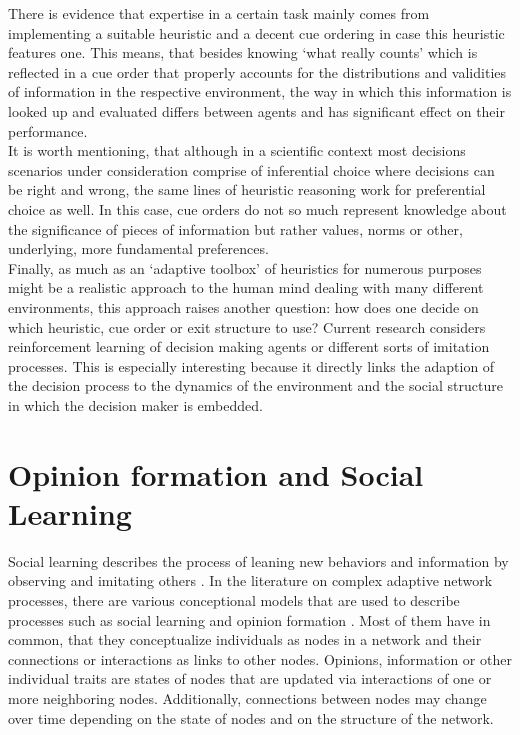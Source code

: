 There is evidence \citep{Garcia-Retamero2009,Pachur2013} that expertise in a certain task mainly comes from implementing a suitable heuristic and a decent cue ordering in case this heuristic features one. This means, that besides knowing `what really counts' which is reflected in a cue order that properly accounts for the distributions and validities of information in the respective environment, the way in which this information is looked up and evaluated differs between agents and has significant effect on their performance.\\
It is worth mentioning, that although in a scientific context most decisions scenarios under consideration comprise of inferential choice where decisions can be right and wrong, the same lines of heuristic reasoning work for preferential choice as well. In this case, cue orders do not so much represent knowledge about the significance of pieces of information but rather values, norms or other, underlying, more fundamental preferences.\\
Finally, as much as an `adaptive toolbox' of heuristics for numerous purposes might be a realistic approach to the human mind dealing with many different environments, this approach raises another question: how does one decide on which heuristic, cue order or exit structure to use? Current research \citep{garcia2009does,Rieskamp2006} considers reinforcement learning of decision making agents or different sorts of imitation processes. This is especially interesting because it directly links the adaption of the decision process to the dynamics of the environment and the social structure in which the decision maker is embedded.\\

\section{Opinion formation and Social Learning}
Social learning describes the process of leaning new behaviors and information by observing and imitating others \citep{Bandura1971}. In the literature on complex adaptive network processes, there are various conceptional models that are used to describe processes such as social learning and opinion formation \citep[for an overview see e.g.]{castellano2009statistical}. Most of them have in common, that they conceptualize individuals as nodes in a network and their connections or interactions as links to other nodes. Opinions, information or other individual traits are states of nodes that are updated via interactions of one or more neighboring nodes. Additionally, connections between nodes may change over time depending on the state of nodes and on the structure of the network.

